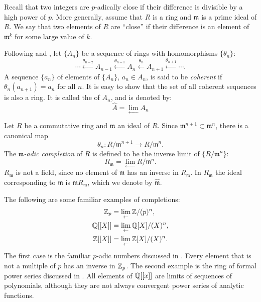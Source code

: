 Recall that two integers are $p$-adically close if their difference is
divisible by a high power of $p$.  More generally, assume that
$R$ is a ring and $\mathfrak{m}$ is a prime ideal of $R$.  We say
that two elements of $R$ are ``close'' if their difference is an
element of $\mathfrak{m}^k$ for some large value of $k$.

Following {\Atiyah} and {\MacDonald} \cite{Atiyah2018-zh}, let
$\{A_n\}$ be a sequence of rings with homomorphisms $\{ \theta_n \}$:
\[
\cdots \xleftarrow{\theta_{n-2}} A_{n-1} \xleftarrow{\theta_{n-1}} A_n
\xleftarrow{\theta_{n}} A_{n+1} \xleftarrow{\theta_{n+1}} \cdots.
\]
A sequence $\{ a_n\}$ of elements of $\{A_n\}$, $a_n \in A_n$, is said
to be {\em coherent} if $\theta_n(a_{n+1}) =
a_n$ for all $n$.  It is easy to show that the set of all coherent
sequences is also a ring.  It is called the  of
$A_n$, and is denoted by:
\[
\hat{A} = \lim_{\leftarrow} A_n
\]

Let $R$ be a commutative ring and $\mathfrak{m}$ an ideal of $R$.  Since
$\mathfrak{m}^{n+1} \subset \mathfrak{m}^n$, there is a canonical map
\[
\theta_n : R/\mathfrak{m}^{n+1} \rightarrow R/\mathfrak{m}^n.
\]
The {\em $\mathfrak{m}$-adic completion}  of $R$ is defined to be
the inverse limit of $\{ R/\mathfrak{m}^n \}$:
\[
R_{\mathfrak{m}} = \lim_{\leftarrow} R/\mathfrak{m}^n.
\]
$R_\mathfrak{m}$ is not a field, since no element of $\mathfrak{m}$
has an inverse in $R_\mathfrak{m}$.  In $R_\mathfrak{m}$ the ideal
corresponding to $\mathfrak{m}$ is $\mathfrak{m} R_\mathfrak{m}$,
which we denote by $\hat{\mathfrak{m}}$.

The following are some familiar examples of completions:
\[
\begin{aligned}
\mathbb{Z}_p & = \displaystyle \lim_{\leftarrow} \mathbb{Z}/(p)^n, \\
\mathbb{Q}[[X]] & = \displaystyle \lim_{\leftarrow} \mathbb{Q}[X]/(X)^n, \\
\mathbb{Z}[[X]] & = \displaystyle \lim_{\leftarrow} \mathbb{Z}[X]/(X)^n.
\end{aligned}
\]
The first case is the familiar $p$-adic numbers discussed in .
Every element that is not a multiple of $p$ has an inverse in $\mathbb{Z}_p$.
The second example is the ring of formal power series discussed in
.  All elements of $\mathbb{Q}[[x]]$ are limits of
sequences of polynomials, although they are not always convergent
power series of analytic functions.

